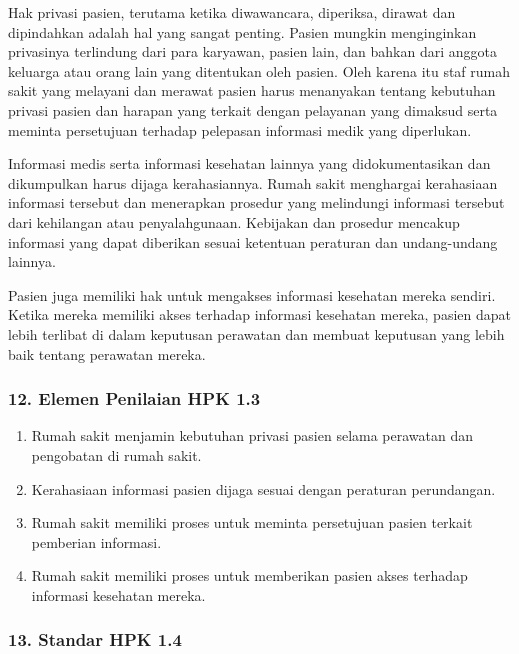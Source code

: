 \documentclass[
]{book}
\providecommand{\tightlist}{%
  \setlength{\itemsep}{0pt}\setlength{\parskip}{0pt}}
\begin{document}
Hak privasi pasien, terutama ketika diwawancara, diperiksa, dirawat dan dipindahkan adalah hal yang sangat penting. Pasien mungkin menginginkan privasinya terlindung dari para karyawan, pasien lain, dan bahkan dari anggota keluarga atau orang lain yang ditentukan oleh pasien. Oleh karena itu staf rumah sakit yang melayani dan merawat pasien harus menanyakan tentang kebutuhan privasi pasien dan harapan yang terkait dengan pelayanan yang dimaksud serta meminta persetujuan terhadap pelepasan informasi medik yang diperlukan.

Informasi medis serta informasi kesehatan lainnya yang didokumentasikan dan dikumpulkan harus dijaga kerahasiannya. Rumah sakit menghargai kerahasiaan informasi tersebut dan menerapkan prosedur yang melindungi informasi tersebut dari kehilangan atau penyalahgunaan. Kebijakan dan prosedur mencakup informasi yang dapat diberikan sesuai ketentuan peraturan dan undang-undang lainnya.

Pasien juga memiliki hak untuk mengakses informasi kesehatan mereka sendiri. Ketika mereka memiliki akses terhadap informasi kesehatan mereka, pasien dapat lebih terlibat di dalam keputusan perawatan dan membuat keputusan yang lebih baik tentang perawatan mereka.

\hypertarget{elemen-penilaian-hpk-1.3}{%
\subsubsection*{12. Elemen Penilaian HPK 1.3}\label{elemen-penilaian-hpk-1.3}}

\begin{enumerate}
\def\labelenumi{\alph{enumi}.}
\tightlist
\item
  Rumah sakit menjamin kebutuhan privasi pasien selama perawatan dan pengobatan di rumah sakit.
\item
  Kerahasiaan informasi pasien dijaga sesuai dengan peraturan perundangan.
\item
  Rumah sakit memiliki proses untuk meminta persetujuan pasien terkait pemberian informasi.
\item
  Rumah sakit memiliki proses untuk memberikan pasien akses terhadap informasi kesehatan mereka.
\end{enumerate}

\hypertarget{standar-hpk-1.4}{%
\subsubsection*{13. Standar HPK 1.4}\label{standar-hpk-1.4}}
\end{document}
